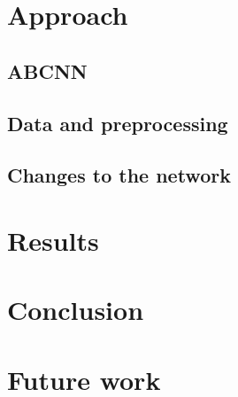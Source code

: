 \documentclass[runningheads,a4paper]{llncs}
\begin{document}
\section{Approach}
\subsection{ABCNN}
\subsection{Data and preprocessing}

\subsection{Changes to the network}

\section{Results}

\section{Conclusion}

\section{Future work}



\end{document}
